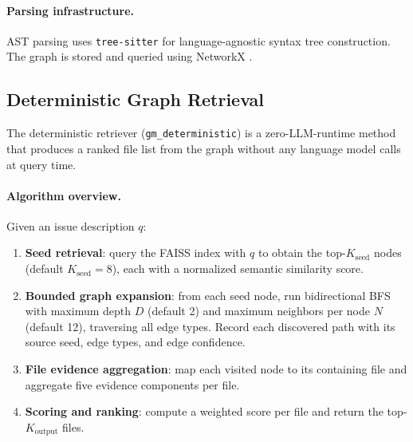 \paragraph{Parsing infrastructure.}
AST parsing uses \texttt{tree-sitter} \citep{brunsfeld2018treesitter} for language-agnostic syntax tree construction. The graph is stored and queried using NetworkX \citep{hagberg2008networkx}.

\subsection{Deterministic Graph Retrieval}
\label{sec:deterministic_retrieval}

The deterministic retriever (\texttt{gm\_deterministic}) is a zero-LLM-runtime method that produces a ranked file list from the graph without any language model calls at query time.

\paragraph{Algorithm overview.}
Given an issue description $q$:
\begin{enumerate}[leftmargin=1.5em]
  \item \textbf{Seed retrieval}: query the FAISS index with $q$ to obtain the top-$K_{\text{seed}}$ nodes (default $K_{\text{seed}} = 8$), each with a normalized semantic similarity score.
  \item \textbf{Bounded graph expansion}: from each seed node, run bidirectional BFS with maximum depth $D$ (default 2) and maximum neighbors per node $N$ (default 12), traversing all edge types. Record each discovered path with its source seed, edge types, and edge confidence.
  \item \textbf{File evidence aggregation}: map each visited node to its containing file and aggregate five evidence components per file.
  \item \textbf{Scoring and ranking}: compute a weighted score per file and return the top-$K_{\text{output}}$ files.
\end{enumerate}

